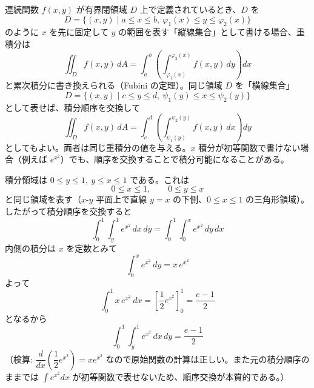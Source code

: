
連続関数 $f(x,y)$ が有界閉領域 $D$ 上で定義されているとき、$D$ を
\[
D = \{(x,y) \mid a \le x \le b,\ \varphi_1(x) \le y \le \varphi_2(x)\}
\]
のように $x$ を先に固定して $y$ の範囲を表す「縦線集合」として書ける場合、重積分は
\[
\iint_{D} f(x,y)\,dA = \int_{a}^{b}\left(\int_{\varphi_1(x)}^{\varphi_2(x)} f(x,y)\,dy\right)dx
\]
と累次積分に書き換えられる（Fubini の定理）。同じ領域 $D$ を「横線集合」
\[
D = \{(x,y) \mid c \le y \le d,\ \psi_1(y) \le x \le \psi_2(y)\}
\]
として表せば、積分順序を交換して
\[
\iint_{D} f(x,y)\,dA = \int_{c}^{d}\left(\int_{\psi_1(y)}^{\psi_2(y)} f(x,y)\,dx\right)dy
\]
としてもよい。両者は同じ重積分の値を与える。$x$ 積分が初等関数で書けない場合（例えば $e^{x^2}$）でも、順序を交換することで積分可能になることがある。

積分領域は $0 \le y \le 1,\ y \le x \le 1$ である。これは
\[
0 \le x \le 1,\qquad 0 \le y \le x
\]
と同じ領域を表す（$x$-$y$ 平面上で直線 $y=x$ の下側、$0\le x\le1$ の三角形領域）。したがって積分順序を交換すると
\[
\int_{0}^{1}\int_{y}^{1} e^{x^{2}}\,dx\,dy = \int_{0}^{1}\int_{0}^{x} e^{x^{2}}\,dy\,dx
\]
内側の積分は $x$ を定数とみて
\[
\int_{0}^{x} e^{x^{2}}\,dy = x\,e^{x^{2}}
\]
よって
\[
\int_{0}^{1} x\,e^{x^{2}}\,dx = \left[\frac{1}{2}e^{x^{2}}\right]_{0}^{1} = \frac{e-1}{2}
\]
となるから
\[
\boxed{\; \int_{0}^{1}\int_{y}^{1} e^{x^{2}}\,dx\,dy = \frac{e-1}{2} \;}
\]
（検算: $\dfrac{d}{dx}\left(\dfrac{1}{2}e^{x^2}\right) = x e^{x^2}$ なので原始関数の計算は正しい。また元の積分順序のままでは $\int e^{x^2}dx$ が初等関数で表せないため、順序交換が本質的である。）
